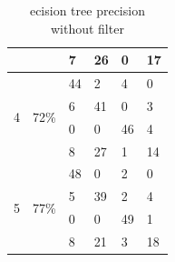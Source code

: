 \documentclass[USenglish]{ifimaster}  %
\begin{document}
\begin{table}[h]
\begin{tabular}{@{}llllll@{}}
			\multicolumn{1}{l|}{} & \multicolumn{1}{l|}{} & \multicolumn{1}{l|}{7} & \multicolumn{1}{l|}{26} & \multicolumn{1}{l|}{0} & 17 \\ \midrule
			\multicolumn{1}{l|}{\multirow{4}{*}{4}} & \multicolumn{1}{l|}{\multirow{4}{*}{72\%}} & \multicolumn{1}{l|}{44} & \multicolumn{1}{l|}{2} & \multicolumn{1}{l|}{4} & 0 \\ \cmidrule(l){3-6} 
			\multicolumn{1}{l|}{} & \multicolumn{1}{l|}{} & \multicolumn{1}{l|}{6} & \multicolumn{1}{l|}{41} & \multicolumn{1}{l|}{0} & 3 \\ \cmidrule(l){3-6} 
			\multicolumn{1}{l|}{} & \multicolumn{1}{l|}{} & \multicolumn{1}{l|}{0} & \multicolumn{1}{l|}{0} & \multicolumn{1}{l|}{46} & 4 \\ \cmidrule(l){3-6} 
			\multicolumn{1}{l|}{} & \multicolumn{1}{l|}{} & \multicolumn{1}{l|}{8} & \multicolumn{1}{l|}{27} & \multicolumn{1}{l|}{1} & 14 \\ \midrule
			\multicolumn{1}{l|}{\multirow{4}{*}{5}} & \multicolumn{1}{l|}{\multirow{4}{*}{77\%}} & \multicolumn{1}{l|}{48} & \multicolumn{1}{l|}{0} & \multicolumn{1}{l|}{2} & 0 \\ \cmidrule(l){3-6} 
			\multicolumn{1}{l|}{} & \multicolumn{1}{l|}{} & \multicolumn{1}{l|}{5} & \multicolumn{1}{l|}{39} & \multicolumn{1}{l|}{2} & 4 \\ \cmidrule(l){3-6} 
			\multicolumn{1}{l|}{} & \multicolumn{1}{l|}{} & \multicolumn{1}{l|}{0} & \multicolumn{1}{l|}{0} & \multicolumn{1}{l|}{49} & 1 \\ \cmidrule(l){3-6} 
			\multicolumn{1}{l|}{} & \multicolumn{1}{l|}{} & \multicolumn{1}{l|}{8} & \multicolumn{1}{l|}{21} & \multicolumn{1}{l|}{3} & 18 \\ \bottomrule
		\end{tabular}
		\caption{ecision tree precision without filter}
		\label{dt1e}
	\end{table}
	\FloatBarrier
\end{document}
